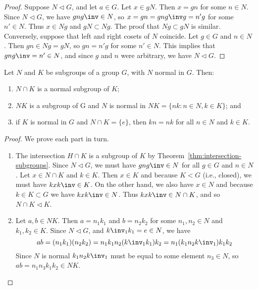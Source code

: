 \begin{proof}
    Suppose \(N \triangleleft G\), and let \(a \in G\). Let \(x \in gN\). Then
    \(x = gn\) for some \(n \in N\). Since \(N \triangleleft G\), we have
    \(gng\inv \in N\), so \(x = gn = gng\inv g = n'g\) for some \(n' \in N\).
    Thus \(x \in Ng\) and \(gN \subset Ng\). The proof that \(Ng \subset gN\) is
    similar. Conversely, suppose that left and right cosets of \(N\) coincide.
    Let \(g \in G\) and \(n \in N\). Then \(gn \in Ng = gN\), so \(gn = n'g\)
    for some \(n' \in N\). This implies that \(gng\inv = n' \in N\), and since
    \(g\) and \(n\) were arbitrary, we have \(N \triangleleft G\).
\end{proof}

\begin{theorem}
    \label{thm:normal-subgroup-props}
    Let \(N\) and \(K\) be subgroups of a group \(G\), with \(N\) normal in
    \(G\). Then:
    \begin{enumerate}[label=(\alph*)]
        \item \(N \cap K\) is a normal subgroup of \(K\);
        \item \(NK\) is a subgroup of G and \(N\) is normal in \(NK = \{nk : n
        \in N, k \in K\}\); and
        \item if \(K\) is normal in \(G\) and \(N \cap K = \{e\}\), then \(kn =
        nk\) for all \(n \in N\) and \(k \in K\).
    \end{enumerate}
\end{theorem}

\begin{proof}
    We prove each part in turn.
    \begin{enumerate}[label=(\alph*), wide]
        \item The intersection \(H \cap K\) is a subgroup of \(K\) by
        Theorem~\ref{thm:intersection-subgroups}. Since \(N \triangleleft G\),
        we must have \(gng\inv \in N\) for all \(g \in G\) and \(n \in N\). Let
        \(x \in N \cap K\) and \(k \in K\). Then \(x \in K\) and because \(K <
        G\) (i.e., closed), we must have \(kxk\inv \in K\). On the other hand,
        we also have \(x \in N\) and because \(k \in K \subset G\) we have
        \(kxk\inv \in N\). Thus \(kxk\inv \in N \cap K\), and so \(N \cap K
        \triangleleft K\).
        
        \item Let \(a, b \in NK\). Then \(a = n_1k_1\) and \(b = n_2k_2\) for
        some \(n_1, n_2 \in N\) and \(k_1, k_2 \in K\). Since \(N \triangleleft
        G\), and \({k\inv}_1k_1 = e \in N\), we have
        \[
            ab = (n_1k_1)(n_2k_2) = n_1k_1n_2({k\inv}_1k_1)k_2 = n_1(k_1n_2{k\inv}_1)k_1k_2
        \]
        Since \(N\) is normal \(k_1n_2{k\inv}_1\) must be equal to some element
        \(n_3 \in N\), so \(ab = n_1n_3k_1k_2 \in NK\).
    \end{enumerate}
\end{proof}

